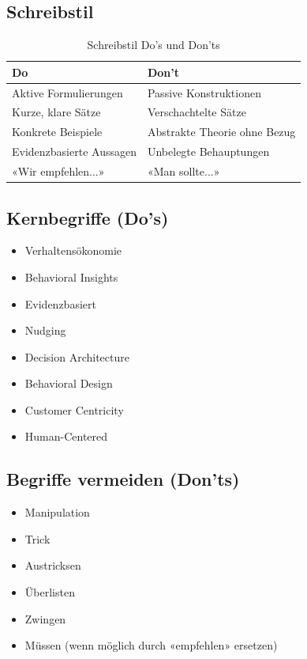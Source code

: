 \subsection{Schreibstil}

\begin{table}[h]
\centering
\caption{Schreibstil Do's und Don'ts}
\label{tab:writing-style}
\begin{tabular}{ll}
\toprule
\textbf{Do} & \textbf{Don't} \\
\midrule
Aktive Formulierungen & Passive Konstruktionen \\
Kurze, klare Sätze & Verschachtelte Sätze \\
Konkrete Beispiele & Abstrakte Theorie ohne Bezug \\
Evidenzbasierte Aussagen & Unbelegte Behauptungen \\
«Wir empfehlen...» & «Man sollte...» \\
\bottomrule
\end{tabular}
\end{table}

\subsection{Kernbegriffe (Do's)}

\begin{itemize}
    \item Verhaltensökonomie
    \item Behavioral Insights
    \item Evidenzbasiert
    \item Nudging
    \item Decision Architecture
    \item Behavioral Design
    \item Customer Centricity
    \item Human-Centered
\end{itemize}

\subsection{Begriffe vermeiden (Don'ts)}

\begin{itemize}
    \item Manipulation
    \item Trick
    \item Austricksen
    \item Überlisten
    \item Zwingen
    \item Müssen (wenn möglich durch «empfehlen» ersetzen)
\end{itemize}


